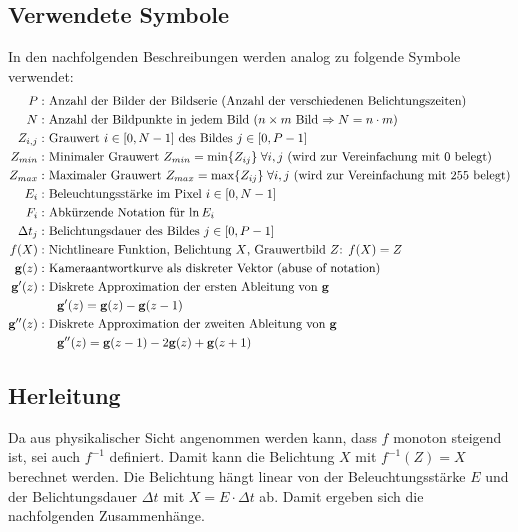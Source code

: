 \subsection{Verwendete Symbole}
In den nachfolgenden Beschreibungen werden analog zu \cite{paper} folgende Symbole verwendet:
\begin{align*}
P: &  \mbox{ Anzahl der Bilder der Bildserie (Anzahl der verschiedenen Belichtungszeiten)}\\
N: & \mbox{ Anzahl der Bildpunkte in jedem Bild ($n \times m$ Bild $\Rightarrow N = n \cdot m$)}\\
Z_{i,j} : &\mbox{ Grauwert $i \in [0, N-1]$ des Bildes $j \in [0, P-1]$}\\
Z_{min} : & \mbox{ Minimaler Grauwert $Z_{min} = \min \{Z_{ij}\} \; \forall i,j$ (wird zur Vereinfachung mit $0$ belegt)}\\
Z_{max} : & \mbox{ Maximaler Grauwert $Z_{max} = \max \{Z_{ij}\} \; \forall i,j$ (wird zur Vereinfachung mit $255$ belegt)}\\
E_i : & \mbox{ Beleuchtungsstärke im Pixel $i \in [0, N-1]$ }\\
F_i : & \mbox{ Abkürzende Notation für $\ln E_i$}\\
\Delta t_j : & \mbox{ Belichtungsdauer des Bildes $j \in [0, P-1]$}\\
f(X) : & \mbox{ Nichtlineare Funktion, Belichtung $X$, Grauwertbild $Z$: $f(X) = Z$}\\
\mathbf g(z) : & \mbox{ Kameraantwortkurve als diskreter Vektor (abuse of notation)}\\
\mathbf{g}'(z) : & \mbox{ Diskrete Approximation der ersten Ableitung von }\mathbf g\\
		& \quad \mathbf g'(z) = \mathbf g(z) - \mathbf g(z-1)\\
\mathbf{g}''(z)  : & \mbox{ Diskrete Approximation der zweiten Ableitung von }\mathbf g\\
		& \quad \mathbf g''(z) = \mathbf g(z-1)-2\mathbf g(z)+\mathbf g(z+1)
\end{align*}

\subsection{Herleitung}
Da aus physikalischer Sicht angenommen werden kann, dass $f$ monoton steigend ist, sei auch $f^{-1}$ definiert. Damit kann die Belichtung $X$ mit $f^{-1}(Z) = X$ berechnet werden. Die Belichtung hängt linear von der Beleuchtungsstärke $E$ und der Belichtungsdauer $\Delta t$ mit $X = E \cdot \Delta t$ ab. Damit ergeben sich die nachfolgenden Zusammenhänge.

